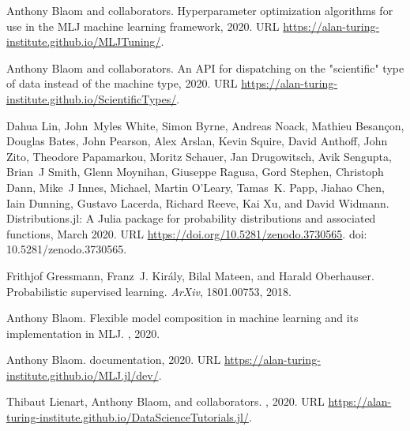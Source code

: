 \documentclass{article}
\begin{document}
\begin{thebibliography}{18}
Anthony Blaom and collaborators.
\newblock Hyperparameter optimization algorithms for use in the {MLJ} machine
  learning framework, 2020.
\newblock URL \url{https://alan-turing-institute.github.io/MLJTuning/}.

Anthony Blaom and collaborators.
\newblock An API for dispatching on the "scientific" type of data instead of the machine type, 2020.
\newblock URL \url{https://alan-turing-institute.github.io/ScientificTypes/}.

Dahua Lin, John~Myles White, Simon Byrne, Andreas Noack, Mathieu Besançon,
  Douglas Bates, John Pearson, Alex Arslan, Kevin Squire, David Anthoff, John
  Zito, Theodore Papamarkou, Moritz Schauer, Jan Drugowitsch, Avik Sengupta,
  Brian~J Smith, Glenn Moynihan, Giuseppe Ragusa, Gord Stephen, Christoph Dann,
  Mike~J Innes, Michael, Martin O'Leary, Tamas~K. Papp, Jiahao Chen, Iain
  Dunning, Gustavo Lacerda, Richard Reeve, Kai Xu, and David Widmann.
\newblock Distributions.jl: {A} {J}ulia package for probability distributions
  and associated functions, March 2020.
\newblock URL \url{https://doi.org/10.5281/zenodo.3730565}.
\newblock doi: {10.5281/zenodo.3730565}.

Frithjof Gressmann, Franz~J. Király, Bilal Mateen, and Harald Oberhauser.
\newblock Probabilistic supervised learning.
\newblock \emph{ArXiv}, 1801.00753, 2018.

Anthony Blaom.
\newblock Flexible model composition in machine learning and its implementation
  in {MLJ}.
\newblock \emph{}, 2020{}.

Anthony Blaom.
 documentation, 2020{}.
\newblock URL \url{https://alan-turing-institute.github.io/MLJ.jl/dev/}.

Thibaut Lienart, Anthony Blaom, and collaborators.
, 2020.
\newblock URL
  \url{https://alan-turing-institute.github.io/DataScienceTutorials.jl/}.

\end{thebibliography}
\end{document}
